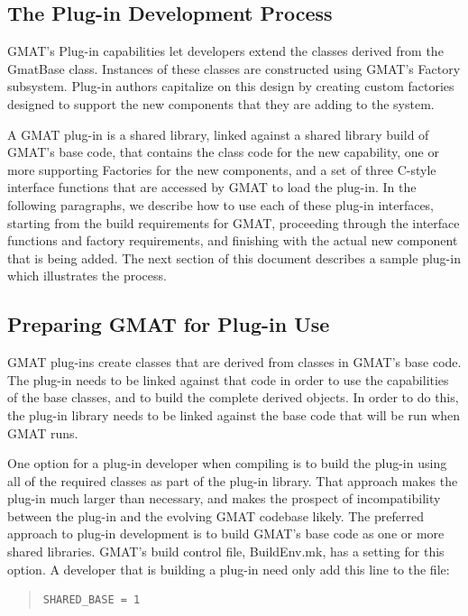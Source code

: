 \subsection{The Plug-in Development Process}

GMAT's Plug-in capabilities let developers extend the classes derived from the
GmatBase class. Instances of these classes are constructed using GMAT's Factory
subsystem.  Plug-in authors capitalize on this design by creating custom
factories designed to support the new components that they are adding to the
system.

A GMAT plug-in is a shared library, linked against a shared library build of
GMAT's base code, that contains the class code for the new capability, one or
more supporting Factories for the new components, and a set of three C-style
interface functions that are accessed by GMAT to load the plug-in.  In the
following paragraphs,  we describe how to use each of these plug-in interfaces,
starting from the build requirements for GMAT, proceeding through the
interface functions and factory requirements, and finishing with the actual new
component that is being added.  The next section of this document describes a
sample plug-in which illustrates the process.

\subsection{Preparing GMAT for Plug-in Use}

GMAT plug-ins create classes that are derived from classes in GMAT's base code.
The plug-in needs to be linked against that code in order to use the
capabilities of the base classes, and to build the complete derived objects. In
order to do this, the plug-in library needs to be linked against the base code
that will be run when GMAT runs.

One option for a plug-in developer when compiling is to build the plug-in
using all of the required classes as part of the plug-in library. That approach
makes the plug-in much larger than necessary, and makes the prospect of
incompatibility between the plug-in and the evolving GMAT codebase likely.  The
preferred approach to plug-in development is to build GMAT's base code as one or
more shared libraries.  GMAT's build control file, BuildEnv.mk, has a setting
for this option.  A developer that is building a plug-in need only add this line
to the file:

\begin{quote}
\begin{verbatim}
SHARED_BASE = 1
\end{verbatim}
\end{quote}

